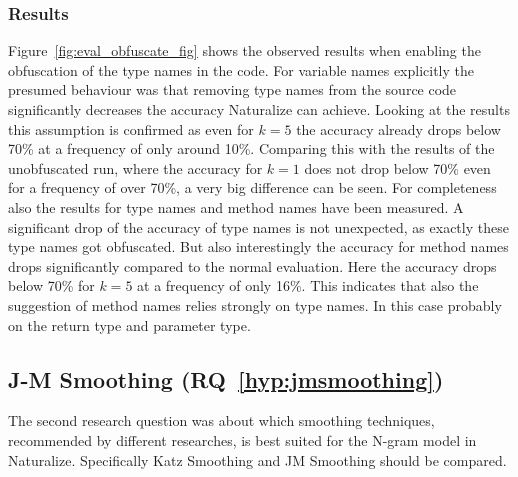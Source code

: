 \subsubsection{Results}
Figure~\ref{fig:eval_obfuscate_fig} shows the observed results when enabling the obfuscation of the type names in the code. For variable names explicitly the presumed behaviour was that removing type names from the source code significantly decreases the accuracy Naturalize can achieve. Looking at the results this assumption is confirmed as even for $k=5$ the accuracy already drops below 70\% at a frequency of only around 10\%. Comparing this with the results of the unobfuscated run, where the accuracy for $k=1$ does not drop below 70\% even for a frequency of over 70\%, a very big difference can be seen. For completeness also the results for type names and method names have been measured. A significant drop of the accuracy of type names is not unexpected, as exactly these type names got obfuscated. But also interestingly the accuracy for method names drops significantly compared to the normal evaluation. Here the accuracy drops below 70\% for $k=5$ at a frequency of only 16\%. This indicates that also the suggestion of method names relies strongly on type names. In this case probably on the return type and parameter type.
\noindent{}


\subsection{J-M Smoothing (RQ~\ref{hyp:jmsmoothing})}

The second research question was about which smoothing techniques, recommended by different researches, is best suited for the N-gram model in Naturalize. Specifically Katz Smoothing and JM Smoothing should be compared.

